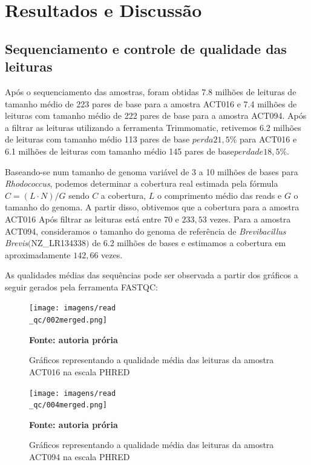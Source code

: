 \chapter{Resultados e Discussão}\label{cap:resultados}

\section{Sequenciamento e controle de qualidade das leituras}
Após o sequenciamento das amostras, foram obtidas 7.8 milhões de leituras de tamanho médio de 
223 pares de base para a amostra ACT016 e 7.4 milhões de leituras com tamanho médio de 222 pares de base
para a amostra ACT094. Após a filtrar as leituras utilizando a ferramenta Trimmomatic, retivemos
6.2 milhões de leituras com tamanho médio 113 pares de base \(perda 21,5\%\) para ACT016 e 6.1 milhões
de leituras com tamanho médio 145 pares de base\(perda de 18,5\%\).

Baseando-se num tamanho de genoma variável de 3 a 10 milhões de bases para \textit{Rhodococcus}, podemos
determinar a cobertura real estimada pela fórmula $C= (L\cdot N)/G $ sendo $C$ a cobertura, $L$ o comprimento
médio das reads e $G$ o tamanho do genoma. A partir disso, obtivemos que a cobertura para a amostra ACT016 Após
filtrar as leituras está entre $70$ e $233,53$ vezes. 
Para a amostra ACT094, consideramos o tamanho do genoma de referência de \textit{Brevibacillus Brevis}$($NZ\_LR134338$)$ 
de 6.2 milhões de bases e estimamos a cobertura em aproximadamente $142,66$ vezes.

As qualidades médias das sequências pode ser observada a partir dos gráficos a seguir gerados pela ferramenta FASTQC:

\begin{figure}[H]
	\caption{Gráficos representando a qualidade média das leituras da amostra ACT016 na escala PHRED}
	\centering
	\texttt{[image: imagens/read\\\_qc/002merged.png]} \\
	\centering
    \begin{small}\textbf{Fonte: autoria prória}\end{small}
\end{figure}
\vspace{\floatsep}
\begin{figure}[H]
	\caption{Gráficos representando a qualidade média das leituras da amostra ACT094 na escala PHRED}
	\centering
	\texttt{[image: imagens/read\\\_qc/004merged.png]} \\
	\centering
    \begin{small}\textbf{Fonte: autoria prória}\end{small}
\end{figure}
\vspace{\floatsep}

